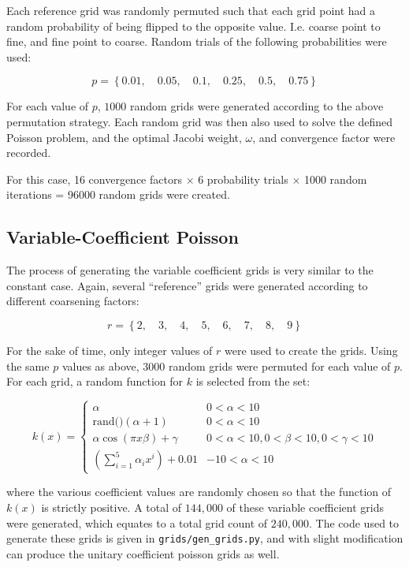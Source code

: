 Each reference grid was randomly permuted such that each grid point had a random probability of being flipped to the opposite value.  I.e. coarse point to fine, and fine point to coarse.  Random trials of the following probabilities were used:

$$ p = \left\{0.01, \quad 0.05, \quad 0.1, \quad 0.25, \quad 0.5, \quad 0.75\right\} $$

For each value of $p$, $1000$ random grids were generated according to the above permutation strategy.  Each random grid was then also used to solve the defined Poisson problem, and the optimal Jacobi weight, $\omega$, and convergence factor were recorded.

For this case, 16 convergence factors $\times$ 6 probability trials $\times$ 1000 random iterations = 96000 random grids were created.

\subsection{Variable-Coefficient Poisson}

The process of generating the variable coefficient grids is very similar to the constant case.  Again, several ``reference'' grids were generated according to different coarsening factors:

$$r = \left\{
2,\quad
3,\quad
4,\quad
5,\quad
6,\quad
7,\quad
8,\quad
9
\right\}$$

For the sake of time, only integer values of $r$ were used to create the grids.  Using the same $p$ values as above, $3000$ random grids were permuted for each value of $p$.  For each grid, a random function for $k$ is selected from the set:

$$
k\left(x\right) = \begin{cases}
\alpha & 0 < \alpha < 10 \\
\text{rand()}\left(\alpha + 1\right) & 0 < \alpha < 10 \\
\alpha\cos\left(\pi x \beta\right) + \gamma & 0 < \alpha < 10, 0 < \beta < 10, 0 < \gamma < 10\\
\left(\sum_{i=1}^5 \alpha_i x^i\right) + 0.01 & -10 < \alpha < 10 \end{cases}
$$

where the various coefficient values are randomly chosen so that the function of $k\left(x\right)$ is strictly positive.  A total of $144,000$ of these variable coefficient grids were generated, which equates to a total grid count of $240,000$.  The code used to generate these grids is given in \texttt{grids/gen\_grids.py}, and with slight modification can produce the unitary coefficient poisson grids as well.

